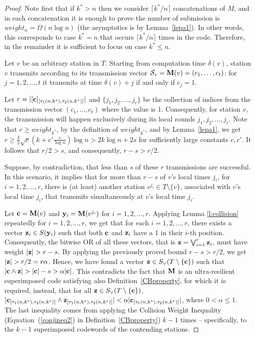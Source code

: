 \documentclass[11pt]{article}
\begin{document}
\begin{proof}
{Note first that if $k^*>n$ then we consider $\lceil k^*/n \rceil$ concatenations of $M$, and in each concatenation it is enough to prove the number of submission is $weight_n=\Omega(n\log n)$ (the asymptotics is by Lemma~\ref{lepa1}). In other words, this corresponds to case $k^*=n$ that occurs $\lceil k^*/n \rceil$ times in the code. Therefore, in the remainder it is sufficient to focus on case $k^*\le n$.}

Let $v$ be an arbitrary station in $T$. 
Starting from computation time $\delta(v)$, station $v$ transmits according to its transmission vector ${\cal S}_{v} = {\mathbf M}(v) = (c_1, \ldots, c_t)$: 
for $j = 1,2, \ldots, t$ it transmits at time 
$\delta(v)+ j$ if and only if  $c_j = 1$. 

Let 
{$r = |[{\mathbf c}]_{[\tau_1(n,k^*),\tau_2(n,k^*)]}|$} and $\{j_1, j_2, \ldots, j_r\}$ be the collection of indices from the transmission vector $(c_1, \ldots, c_t)$ where the value is 1. 
Consequently, for station $v$, the transmission will happen 
exclusively during its local rounds ${j_1}, {j_2}, \ldots, {j_r}$.
{Note that $r\ge weight_{k^*}$, by the definition of $weight_{k^*}$, and by Lemma~\ref{lepa1}, we get $r\ge \frac{3}{5}\sqrt{c}(k+c'\frac{s}{\log n})\log n > 2k\log n+2s$ for sufficiently large constants $c,c'$. It follows that 
$r/2>s$, and consequently, $r-s>r/2$.}

Suppose, by contradiction, that 
{less than $s$}
of these $r$ transmissions 
{are}
successful. In this scenario, it implies that for 
{more than $r-s$ of}
$v$'s 
local 
{times} 
$j_i$, for $i=1,2,\ldots,r$,
there is (at least) another station $v^{j_i} \in T \setminus\{v\}$,
associated with $v$'s local time $j_i$, that transmits simultaneously at $v$'s local time $j_i$.

Let ${\mathbf c} = {\mathbf M}(v)$ and ${\mathbf y}_i = {\mathbf M}(v^{j_i})$
for $i = 1, 2, \ldots, r$.
Applying Lemma \ref{l:collision} repeatedly  
for $i = 1, 2, \ldots, r$, we get that for each 
$i = 1, 2, \ldots, r$,  there exists a
vector ${\mathbf z}_i \in S({\mathbf y}_i)$ such that both 
${\mathbf c}$ and ${\mathbf z}_i$ have a 1 in their $i$-th position.
Consequently, the bitwise OR of all these
vectors, that is 
${\mathbf z} = \bigvee_{i=1}^r {\mathbf z}_i$, must have weight
{$|{\mathbf z}| > r -s$. By applying the previously proved bound $r-s>r/2$, we get $|{\mathbf z}| > r/2 = r\alpha$.}
{Hence, we have found a vector ${\mathbf z} \in S_{\vee}(T \setminus \{ {\mathbf c} \})$
 such that $|{\mathbf c} \wedge {\mathbf z}| > |{\mathbf c}|-s>\alpha |{\mathbf c}|$.
This contradicts the fact that ${\mathbf M}$ is an ultra-resilient 
superimposed code satisfying also Definition~\ref{CBproperty}, for which it is required, instead, that
for all ${\mathbf z} \in S_{\vee}(T \setminus \{ {\mathbf c} \})$,
$|{\mathbf c}_{[\tau_1(n,k^*),\tau_2(n,k^*)]} \wedge {\mathbf z}_{[\tau_1(n,k^*),\tau_2(n,k^*)]}| < \alpha |{\mathbf c}_{[\tau_1(n,k^*),\tau_2(n,k^*)]}|$, where $0< \alpha \le 1$. The last inequality comes from applying the Collision Weight Inequality (Equation~(\ref{conjineq2}) in Definition~\ref{CBproperty}) $k-1$ times -- specifically, to the $k-1$ superimposed codewords of the contending stations.}
\end{proof}
\end{document}
